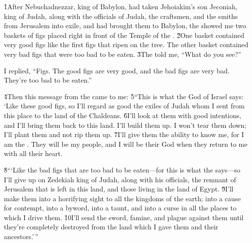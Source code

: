 \v{1}After Nebuchadnezzar, king of Babylon, had taken Jehoiakim's son Jeconiah, king of Judah, along with the officials of Judah, the craftsmen, and the smiths from Jerusalem into exile, and had brought them to Babylon, the  showed me two baskets of figs placed right in front of the Temple of the . \v{2}One basket contained very good figs like the first figs that ripen on the tree. The other basket contained very bad figs that were too bad to be eaten. \v{3}The  told me, ``What do you see?''

I replied, ``Figs. The good figs are very good, and the bad figs are very bad. They're too bad to be eaten.''

\v{4}Then this message from the  came to me: \v{5}``This is what the  God of Israel says: `Like these good figs, so I'll regard as good the exiles of Judah whom I sent from this place to the land of the Chaldeans. \v{6}I'll look at them with good intentions, and I'll bring them back to this land. I'll build them up. I won't tear them down; I'll plant them and not rip them up. \v{7}I'll give them the ability to know me, for I am the . They will be my people, and I will be their God when they return to me with all their heart.

\v{8}```Like the bad figs that are too bad to be eaten---for this is what the  says---so I'll give up on Zedekiah king of Judah, along with his officials, the remnant of Jerusalem that is left in this land, and those living in the land of Egypt. \v{9}I'll make them into a horrifying sight to all the kingdoms of the earth; into a cause for contempt, into a byword, into a taunt, and into a curse in all the places to which I drive them. \v{10}I'll send the sword, famine, and plague against them until they're completely destroyed from the land which I gave them and their ancestors.'\,''


